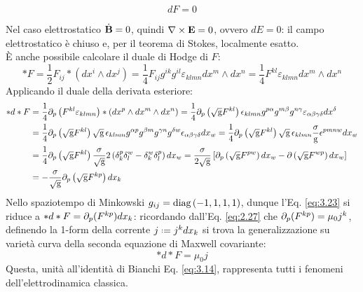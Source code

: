 \begin{equation}
	dF = 0
	\label{eq:3.14}
\end{equation}

Nel caso elettrostatico $ \dot{\mathbf{B}} = 0 $, quindi $ \nabla\times\mathbf{E} = 0 $, ovvero $ dE = 0 $: il campo elettrostatico è chiuso e, per il teorema di Stokes, localmente esatto.\\
È anche possibile calcolare il duale di Hodge di $ F $:
\begin{equation}
	*F = \frac{1}{2}F_{ij} * \left( dx^i \wedge dx^j \right) = \frac{1}{4} F_{ij} g^{ik} g^{il} \varepsilon_{klmn} dx^m \wedge dx^n = \frac{1}{4} F^{kl} \varepsilon_{klmn} dx^m \wedge dx^n
	\label{eq:3.22}
\end{equation}
Applicando il duale della derivata esteriore:
\begin{equation}
	\begin{split}
		*d*F &= \frac{1}{4} \partial_p \left( F^{kl} \varepsilon_{klmn} \right) * \left( dx^p \wedge dx^m \wedge dx^n \right) = \frac{1}{4} \partial_p \left( \sqrt{\mathbf{\text{g}}} F^{kl} \right) \epsilon_{klmn} g^{p\alpha} g^{m\beta} g^{n\gamma} \varepsilon_{\alpha\beta\gamma\delta} dx^{\delta}\\
		     &= \frac{1}{4} \partial_p \left( \sqrt{\mathbf{\text{g}}} F^{kl} \right) \sqrt{\mathbf{\text{g}}} \, \epsilon_{klmn} g^{\alpha p} g^{\beta m} g^{\gamma n} g^{\delta w} \epsilon_{\alpha\beta\gamma\delta} dx_w = \frac{1}{4} \partial_p \left( \sqrt{\mathbf{\text{g}}} F^{kl} \right) \sqrt{\mathbf{\text{g}}}\, \epsilon_{klmn} \frac{\sigma}{\mathbf{\text{g}}} \epsilon^{pmnw} dx_w\\
		     &= \frac{1}{4} \partial_p \left( \sqrt{\mathbf{\text{g}}} F^{kl} \right) \frac{\sigma}{\sqrt{\mathbf{\text{g}}}} 2 \left( \delta^p_k \delta^w_l - \delta^w_k \delta^p_l \right) dx_w = \frac{\sigma}{2\sqrt{\mathbf{\text{g}}}} \left[ \partial_p \left( \sqrt{\mathbf{\text{g}}} F^{pw} \right) dx_w - \partial \left( \sqrt{\mathbf{\text{g}}} F^{wp} \right) dx_w \right]\\
		     &= - \frac{\sigma}{\sqrt{\mathbf{\text{g}}}} \partial_p \left( \sqrt{\mathbf{\text{g}}} F^{kp} \right) dx_k
	\end{split}
	\label{eq:3.23}
\end{equation}
Nello spaziotempo di Minkowski $ g_{ij} = \text{diag}\,(-1,1,1,1) $, dunque l'Eq. \ref{eq:3.23} si riduce a $ *d*F = \partial_p (F^{kp}) dx_k $: ricordando dall'Eq. \ref{eq:2.27} che $ \partial_p (F^{kp}) = \mu_0 j^k $, definendo la 1-form della corrente $ j \defeq j^k dx_k $ si trova la generalizzazione su varietà curva della seconda equazione di Maxwell covariante:
\begin{equation}
	*d*F = \mu_0 j
	\label{eq:3.24}
\end{equation}
Questa, unità all'identità di Bianchi Eq. \ref{eq:3.14}, rappresenta tutti i fenomeni dell'elettrodinamica classica.










